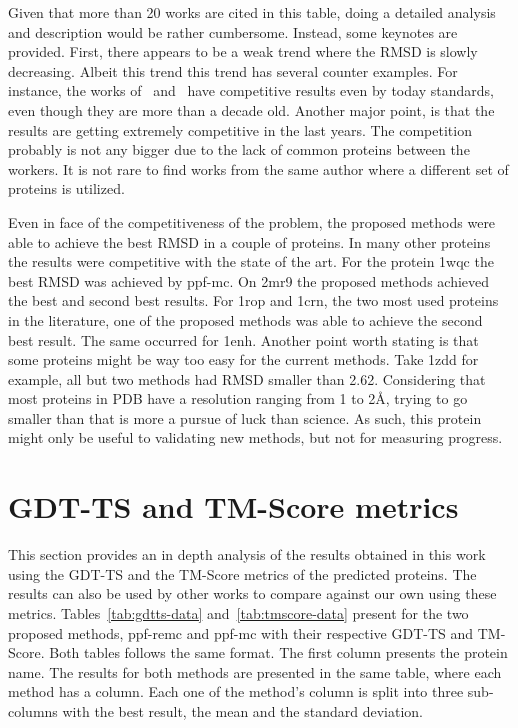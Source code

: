 Given that more than 20 works are cited in this table, doing a detailed
analysis and description would be rather cumbersome. Instead, some keynotes are
provided. First, there appears to be a weak trend where the RMSD is slowly
decreasing. Albeit this trend this trend has several counter examples.
For instance, the works of~\cite{cazacu2014steel} and~\cite{judy2009multi}
have competitive results even by today standards, even though they are more than
a decade old. Another major point, is that the results are getting extremely
competitive in the last years. The competition probably is not any bigger due to
the lack of common proteins between the workers. It is not rare to find works
from the same author where a different set of proteins is utilized.

Even in face of the competitiveness of the problem, the proposed methods were
able to achieve the best RMSD in a couple of proteins. In many other proteins
the results were competitive with the state of the art. For the protein 1wqc
the best RMSD was achieved by ppf-mc. On 2mr9 the proposed methods
achieved the best and second best results. For 1rop and 1crn, the two most used
proteins in the literature, one of the proposed methods was able to achieve
the second best result. The same occurred for 1enh. Another point worth stating
is that some proteins might be way too easy for the current methods. Take 1zdd
for example, all but two methods had RMSD smaller than 2.62. Considering that
most proteins in PDB have a resolution ranging from 1 to 2\AA, trying to go
smaller than that is more a pursue of luck than science. As such, this protein
might only be useful to validating new methods, but not for measuring progress.

\section{GDT-TS and TM-Score metrics}
\label{sec:other-metrics}

This section provides an in depth analysis of the results obtained in this
work using the GDT-TS and the TM-Score metrics of the predicted proteins. The
results can also be used by other works to compare against our own using
these metrics. Tables~\ref{tab:gdtts-data} and~\ref{tab:tmscore-data} present
for the two proposed methods, ppf-remc and ppf-mc with their
respective GDT-TS and TM-Score. Both tables follows the same format. The
first column presents the protein name. The results for both methods are
presented in the same table, where each method has a column. Each one of the
method's column is split into three sub-columns with the best result, the mean
and the standard deviation.

